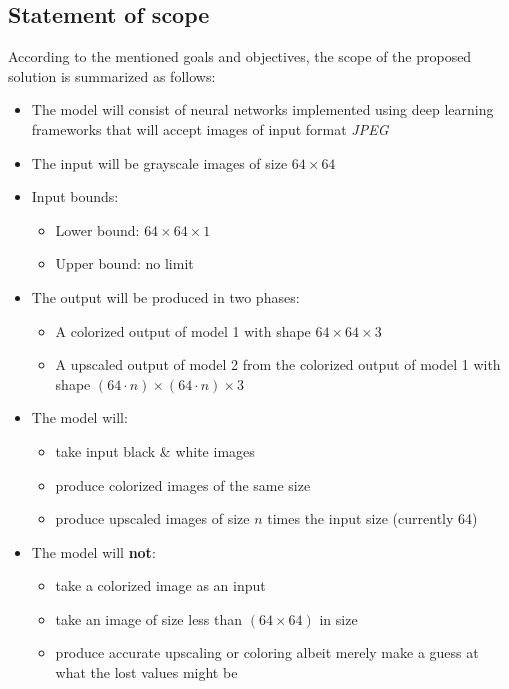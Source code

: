 \documentclass[oneside,a4paper,12pt]{report}
\begin{document}
 \subsection{Statement of scope}
 \hspace*{0.25 in}According to the mentioned goals and objectives, the scope of the proposed solution is summarized as follows:
	\begin{itemize}
	\item The model will consist of neural networks implemented using deep learning frameworks that will accept images of input format \textit{JPEG}
	\item The input will be grayscale images of size $64\times 64$
	\item Input bounds:
	\begin{itemize}
		\item Lower bound: $64\times 64\times 1$
		\item Upper bound: no limit
	\end{itemize}
	\item The output will be produced in two phases:
	\begin{itemize}
		\item A colorized output of model 1 with shape $64\times 64\times 3$
		\item A upscaled output of model 2 from the colorized output of model 1 with shape $(64\cdot n)\times (64\cdot n)\times 3$
	\end{itemize}
	\item The model will:
	\begin{itemize}
		\item take input black \& white images
		\item produce colorized images of the same size
		\item produce upscaled images of size $n$ times the input size (currently 64)
	\end{itemize}
	\item The model will \textbf{not}:
	\begin{itemize}
		\item take a colorized image as an input
		\item take an image of size less than $(64 \times 64)$ in size
		\item produce accurate upscaling or coloring albeit merely make a guess at what the lost values might be
	\end{itemize}
	\end{itemize}
\end{document}
